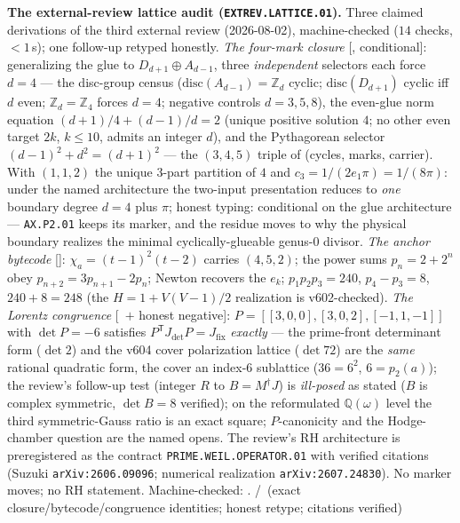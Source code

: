 \documentclass[11pt,a4paper]{article}
\theoremstyle{definition}
\begin{document}
\par\smallskip\noindent\textbf{The external-review lattice audit
(\texttt{EXTREV.LATTICE.01}).}
Three claimed derivations of the third external review (2026-08-02),
machine-checked ($14$ checks, ${<}1$\,s); one follow-up retyped
honestly.  \emph{The four-mark closure} [\mE, conditional]:
generalizing the glue to $D_{d+1}\oplus A_{d-1}$, three
\emph{independent} selectors each force $d=4$ --- the disc-group
census ($\mathrm{disc}(A_{d-1})=\mathbb Z_d$ cyclic;
$\mathrm{disc}(D_{d+1})$ cyclic iff $d$ even; $\mathbb Z_d=\mathbb
Z_4$ forces $d=4$; negative controls $d=3,5,8$), the even-glue norm
equation $(d{+}1)/4+(d{-}1)/d=2$ (unique positive solution $4$; no
other even target $2k$, $k\le10$, admits an integer $d$), and the
Pythagorean selector $(d{-}1)^2+d^2=(d{+}1)^2$ --- the $(3,4,5)$
triple of (cycles, marks, carrier).  With $(1,1,2)$ the unique
3-part partition of $4$ and $c_3=1/(2e_1\pi)=1/(8\pi)$: under the
named architecture the two-input presentation reduces to \emph{one}
boundary degree $d=4$ plus $\pi$; honest typing: conditional on the
glue architecture --- \texttt{AX.P2.01} keeps its marker, and the
residue moves to why the physical boundary realizes the minimal
cyclically-glueable genus-0 divisor.  \emph{The anchor bytecode}
[\mE]: $\chi_a=(t{-}1)^2(t{-}2)$ carries $(4,5,2)$; the power sums
$p_n=2+2^n$ obey $p_{n+2}=3p_{n+1}-2p_n$; Newton recovers the $e_k$;
$p_1p_2p_3=240$, $p_4-p_3=8$, $240+8=248$ (the $H=1+V(V{-}1)/2$
realization is v602-checked).  \emph{The Lorentz congruence}
[\mE\ $+$ honest negative]: $P=[[3,0,0],[3,0,2],[-1,1,-1]]$ with
$\det P=-6$ satisfies $P^{\mathsf T}J_{\mathrm{det}}P=
J_{\mathrm{fix}}$ \emph{exactly} --- the prime-front determinant
form ($\det 2$) and the v604 cover polarization lattice ($\det 72$)
are the \emph{same} rational quadratic form, the cover an index-6
sublattice ($36=6^2$, $6=p_2(a)$); the review's follow-up test
(integer $R$ to $B=M^\dagger J$) is \emph{ill-posed} as stated ($B$
is complex symmetric, $\det B=8$ verified); on the reformulated
$\mathbb Q(\omega)$ level the third symmetric-Gauss ratio is an
exact square; $P$-canonicity and the Hodge-chamber question are the
named opens.  The review's RH architecture is preregistered as the
contract \texttt{PRIME.WEIL.OPERATOR.01} with verified citations
(Suzuki \texttt{arXiv:2606.09096}; numerical realization
\texttt{arXiv:2607.24830}).  No marker moves; no RH statement.
Machine-checked: .
\mE/\mC\ (exact closure/bytecode/congruence identities; honest
retype; citations verified)
\par\smallskip
\end{document}
